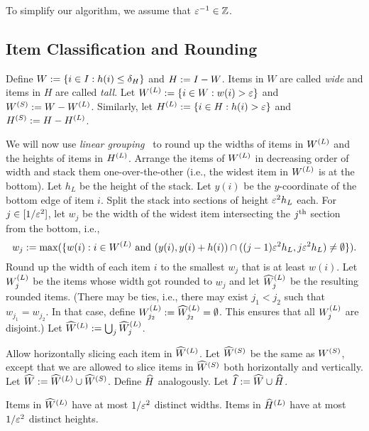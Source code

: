 To simplify our algorithm, we assume that $\varepsilon^{-1} \in \mathbb{Z}$.

\subsection{Item Classification and Rounding}
\label{sec:bp-algo:round}

Define $W := \{i \in I: h(i) \le \delta_H \}$ and $H := I - W$.
Items in $W$ are called \emph{wide} and items in $H$ are called \emph{tall}.
Let $W^{(L)} := \{i \in W: w(i) > \varepsilon \}$ and $W^{(S)} := W - W^{(L)}$.
Similarly, let $H^{(L)} := \{i \in H: h(i) > \varepsilon \}$ and $H^{(S)} := H - H^{(L)}$.

We will now use \emph{linear grouping}~\cite{bp-aptas,kenyon1996strip}
to round up the widths of items in $W^{(L)}$ and the heights of items in $H^{(L)}$.
Arrange the items of $W^{(L)}$ in decreasing order of width and stack them
one-over-the-other (i.e., the widest item in $W^{(L)}$ is at the bottom).
Let $h_L$ be the height of the stack.
Let $y(i)$ be the $y$-coordinate of the bottom edge of item $i$.
Split the stack into sections of height $\varepsilon^2h_L$ each.
For $j \in [1/\varepsilon^2]$, let $w_j$ be the width of the
widest item intersecting the $j^{\textrm{th}}$ section from the bottom, i.e.,
\[ w_j := \max(\{w(i): i \in W^{(L)} \textrm{ and } (y(i), y(i) + h(i))
    \cap ((j-1)\varepsilon^2 h_L, j\varepsilon^2 h_L) \neq \emptyset\}). \]
Round up the width of each item $i$ to the smallest $w_j$ that is at least $w(i)$.
Let $W^{(L)}_j$ be the items whose width got rounded to $w_j$
and let $\widehat{W}^{(L)}_j$ be the resulting rounded items.
(There may be ties, i.e., there may exist $j_1 < j_2$ such that $w_{j_1} = w_{j_2}$.
In that case, define $W^{(L)}_{j_2} := \widehat{W}^{(L)}_{j_2} = \emptyset$.
This ensures that all $W^{(L)}_j$ are disjoint.)
Let $\widehat{W}^{(L)} := \bigcup_j \widehat{W}^{(L)}_j$.

Allow horizontally slicing each item in $\widehat{W}^{(L)}$.
Let $\widehat{W}^{(S)}$ be the same as $W^{(S)}$, except that we are allowed
to slice items in $\widehat{W}^{(S)}$ both horizontally and vertically.
Let $\widehat{W} := \widehat{W}^{(L)} \cup \widehat{W}^{(S)}$.
Define $\widehat{H}$ analogously. Let $\widehat{I} := \widehat{W} \cup \widehat{H}$.

\begin{claim}
Items in $\widehat{W}^{(L)}$ have at most $1/\varepsilon^2$ distinct widths.
Items in $\widehat{H}^{(L)}$ have at most $1/\varepsilon^2$ distinct heights.
\end{claim}

